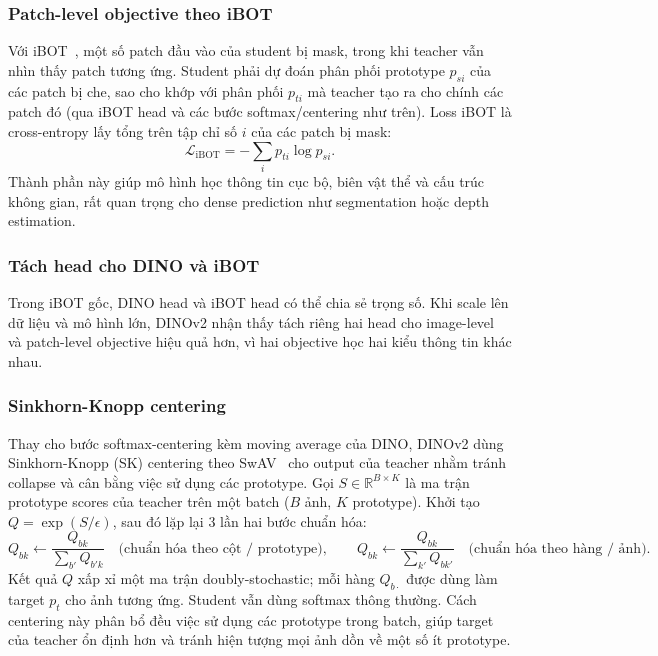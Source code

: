 \subsubsection{Patch-level objective theo iBOT}
Với iBOT~\cite{ibot}, một số patch đầu vào của student bị mask, trong khi teacher vẫn nhìn thấy patch tương ứng. Student phải dự đoán phân phối prototype $p_{si}$ của các patch bị che, sao cho khớp với phân phối $p_{ti}$ mà teacher tạo ra cho chính các patch đó (qua iBOT head và các bước softmax/centering như trên). Loss iBOT là cross-entropy lấy tổng trên tập chỉ số $i$ của các patch bị mask:
\begin{equation}
\mathcal{L}_{\mathrm{iBOT}} = -\sum_i p_{ti} \log p_{si} .
\end{equation}
Thành phần này giúp mô hình học thông tin cục bộ, biên vật thể và cấu trúc không gian, rất quan trọng cho dense prediction như segmentation hoặc depth estimation.

\subsubsection{Tách head cho DINO và iBOT}
Trong iBOT gốc, DINO head và iBOT head có thể chia sẻ trọng số. Khi scale lên dữ liệu và mô hình lớn, DINOv2 nhận thấy tách riêng hai head cho image-level và patch-level objective hiệu quả hơn, vì hai objective học hai kiểu thông tin khác nhau.

\subsubsection{Sinkhorn-Knopp centering}
Thay cho bước softmax-centering kèm moving average của DINO, DINOv2 dùng Sinkhorn-Knopp (SK) centering theo SwAV~\cite{swav} cho output của teacher nhằm tránh collapse và cân bằng việc sử dụng các prototype. Gọi $S \in \mathbb{R}^{B \times K}$ là ma trận prototype scores của teacher trên một batch ($B$ ảnh, $K$ prototype). Khởi tạo $Q = \exp(S/\epsilon)$, sau đó lặp lại $3$ lần hai bước chuẩn hóa:
\begin{equation}
Q_{bk} \leftarrow \frac{Q_{bk}}{\sum_{b'} Q_{b'k}}
\quad\text{(chuẩn hóa theo cột / prototype)},
\qquad
Q_{bk} \leftarrow \frac{Q_{bk}}{\sum_{k'} Q_{bk'}}
\quad\text{(chuẩn hóa theo hàng / ảnh)} .
\end{equation}
Kết quả $Q$ xấp xỉ một ma trận doubly-stochastic; mỗi hàng $Q_{b\cdot}$ được dùng làm target $p_t$ cho ảnh tương ứng. Student vẫn dùng softmax thông thường. Cách centering này phân bổ đều việc sử dụng các prototype trong batch, giúp target của teacher ổn định hơn và tránh hiện tượng mọi ảnh dồn về một số ít prototype.

